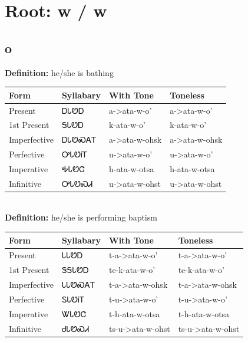 \documentclass{article}%
\begin{document}
%
\normalsize%
\section*{Root: w / w}%
\subsection*{o}%
\textbf{Definition: }%
he/she is bathing%
\\[0.5em]%
\begin{tabular}{|l|l|l|l|}%
\hline%
\textbf{Form}&\textbf{Syllabary}&\textbf{With Tone}&\textbf{Toneless}\\%
\hline%
Present&ᎠᏓᏬᎠ&a{-}>ata{-}w{-}o'&a{-}>ata{-}w{-}o'\\%
1st Present&ᎦᏓᏬᎠ&k{-}ata{-}w{-}o'&k{-}ata{-}w{-}o'\\%
Imperfective&ᎠᏓᏬᏍᎪᎢ&a{-}>ata{-}w{-}ohsk&a{-}>ata{-}w{-}ohsk\\%
Perfective&ᎤᏓᏬᎥᎢ&u{-}>ata{-}w{-}o'&u{-}>ata{-}w{-}o'\\%
Imperative&ᎭᏓᏬᏣ&h{-}ata{-}w{-}otsa&h{-}ata{-}w{-}otsa\\%
Infinitive&ᎤᏓᏬᏍᏗ&u{-}>ata{-}w{-}ohst&u{-}>ata{-}w{-}ohst\\%
\hline%
\end{tabular}%
\\[1em]%
\textbf{Definition: }%
he/she is performing baptism%
\\[0.5em]%
\begin{tabular}{|l|l|l|l|}%
\hline%
\textbf{Form}&\textbf{Syllabary}&\textbf{With Tone}&\textbf{Toneless}\\%
\hline%
Present&ᏓᏓᏬᎠ&t{-}a{-}>ata{-}w{-}o'&t{-}a{-}>ata{-}w{-}o'\\%
1st Present&ᏕᎦᏓᏬᎠ&te{-}k{-}ata{-}w{-}o'&te{-}k{-}ata{-}w{-}o'\\%
Imperfective&ᏓᏓᏬᏍᎪᎢ&t{-}a{-}>ata{-}w{-}ohsk&t{-}a{-}>ata{-}w{-}ohsk\\%
Perfective&ᏚᏓᏬᎥᎢ&t{-}u{-}>ata{-}w{-}o'&t{-}u{-}>ata{-}w{-}o'\\%
Imperative&ᏔᏓᏬᏣ&t{-}h{-}ata{-}w{-}otsa&t{-}h{-}ata{-}w{-}otsa\\%
Infinitive&ᏧᏓᏬᏍᏗ&ts{-}u{-}>ata{-}w{-}ohst&ts{-}u{-}>ata{-}w{-}ohst\\%
\hline%
\end{tabular}%
\\[1em]%
\end{document}
